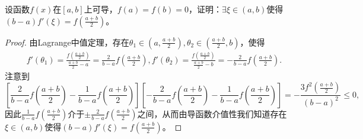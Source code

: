 \documentclass[../../main.tex]{subfiles}
\begin{document}
\begin{example}
设函数$f(x)$在$[a,b]$上可导，$f(a)=f(b)=0$，证明：$\exists \xi \in (a,b)$使得$(b - a)f'(\xi)=f\left(\frac{a + b}{2}\right)$。
\end{example}
\begin{proof}
由Lagrange中值定理，存在$ \theta_1 \in \left( a,\frac{a+b}{2} \right) ,\theta_2 \in \left( \frac{a+b}{2},b \right) $，使得
\begin{align*}
f'(\theta_1)=\frac{f\left( \frac{a+b}{2} \right)}{\frac{a+b}{2}-a}=\frac{2}{b-a}f\left( \frac{a+b}{2} \right) , f'(\theta_2)=\frac{f\left( \frac{a+b}{2} \right)}{\frac{a+b}{2}-b}=-\frac{2}{b-a}f\left( \frac{a+b}{2} \right) .
\end{align*}
注意到
$$\left[\frac{2}{b - a}f\left(\frac{a + b}{2}\right)-\frac{1}{b - a}f\left(\frac{a + b}{2}\right)\right]\left[-\frac{2}{b - a}f\left(\frac{a + b}{2}\right)-\frac{1}{b - a}f\left(\frac{a + b}{2}\right)\right]=-\frac{3f^2\left(\frac{a + b}{2}\right)}{(b - a)^2}\leqslant 0,$$
因此$\frac{1}{b - a}f\left(\frac{a + b}{2}\right)$介于$\pm \frac{2}{b - a}f\left(\frac{a + b}{2}\right)$之间，从而由导函数介值性我们知道存在$\xi \in (a,b)$使得$(b - a)f'(\xi)=f\left(\frac{a + b}{2}\right)$。

\end{proof}
\end{document}
